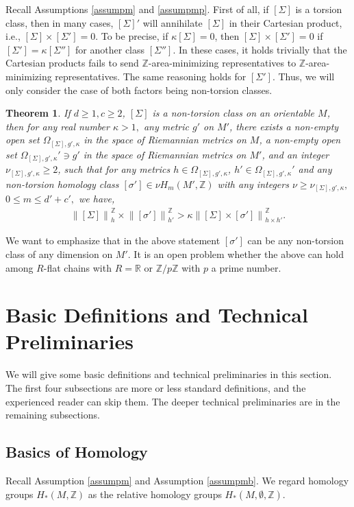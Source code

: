 \documentclass[11pt,a4paper]{amsart}
\numberwithin{equation}{section}
\newcommand{\es}{\emptyset}
\newcommand{\Om}{\Omega}
\newcommand{\si}{\sigma}
\newcommand{\Si}{\Sigma}
\newcommand{\no}[1]{\left\lVert#1\right\rVert}
\newcommand{\ka}{\kappa}
\newcommand{\R}{\mathbb{R}}
\newcommand{\Z}{\mathbb{Z}}
\theoremstyle{plain}
\newtheorem{thm}{Theorem}
\theoremstyle{definition}
\numberwithin{equation}{subsection}
\begin{document}
	Recall Assumptions \ref{assumpm} and \ref{assumpmp}. First of all, if $[\Si]$ is a torsion class, then in many cases, $[\Si]'$ will annihilate $[\Si]$ in their Cartesian product, i.e., $[\Si]\times[\Si']=0$. To be precise, if $\ka[\Si]=0$, then $[\Si]\times[\Si']=0$ if $[\Si']=\ka[\Si'']$ for another class $[\Si'']$. In these cases, it holds trivially that the Cartesian products fails to send $\Z$-area-minimizing representatives to $\Z$-area-minimizing representatives. The same reasoning holds for $[\Si'].$ Thus, we will only consider the case of both factors being non-torsion classes. 
	\begin{thm}\label{thmkun}
		If $d\ge 1,c\ge 2$, $[\Si]$ is a non-torsion class on an orientable $M$, then for any real number $\ka>1,$ any metric $g'$ on $M'$, there exists a non-empty open set $\Om_{[\Si],g',\ka}$ in the space of Riemannian metrics on $M$, a non-empty open set $\Om_{[\Si],g',\ka}'\ni g'$ in the space of Riemannian metrics on $M'$, and  an integer $\nu_{[\Si],g',\ka}\ge 2$, such that for any metrics $h\in \Om_{[\Si],g',\ka}$, $h'\in \Om_{[\Si],g',\ka}'$ and any non-torsion homology class $[\si']\in \nu H_m(M',\Z)$ with  any integers $\nu\ge \nu_{[\Si],g',\ka},$ $0\le m\le d'+c',$ we have,
		\begin{align}
			\no{[\Si]}_h^{\Z}\times \no{[\si']}_{h'}^{\Z}> \ka \no{[\Si]\times[\si']}_{h\times h'}^{\Z}.
		\end{align}
	\end{thm}
	We want to emphasize that in the above statement $[\si']$ can be any non-torsion class of any dimension on $M'$.	It is an open problem \cite{FMmc} whether the above can hold among $R$-flat chains with $R=\R$ or $\Z/p\Z$ with $p$ a prime number.
	\section{Basic Definitions and Technical Preliminaries}\label{secbd}
	We will give some basic definitions and technical preliminaries in this section. The first four subsections are more or less standard definitions, and the experienced reader can skip them. The deeper technical preliminaries are in the remaining subsections.
	\subsection{Basics of Homology}
	Recall Assumption \ref{assumpm} and Assumption \ref{assumpmb}. We regard homology groups $H_\ast(M,\Z)$ as the relative homology groups $H_\ast(M,\es,\Z).$ 
	
\end{document}
